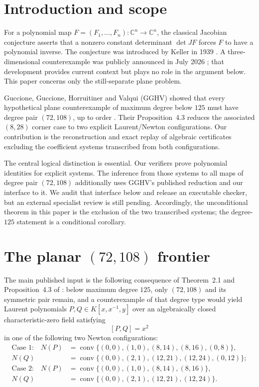\documentclass[11pt,a4paper]{article}
\theoremstyle{remark}
\newcommand{\C}{\mathbb{C}}
\begin{document}
\tableofcontents

\section{Introduction and scope}

For a polynomial map $F=(F_1,\ldots,F_n):\C^n\to\C^n$, the classical Jacobian conjecture asserts that a nonzero constant determinant $\det JF$ forces $F$ to have a polynomial inverse. The conjecture was introduced by Keller in 1939 \cite{Keller1939}. A three-dimensional counterexample was publicly announced in July 2026 \cite{Alpoge2026}; that development provides current context but plays no role in the argument below. This paper concerns only the still-separate plane problem.

Guccione, Guccione, Horruitiner and Valqui (GGHV) showed that every hypothetical plane counterexample of maximum degree below $125$ must have degree pair $(72,108)$, up to order \cite{GGHV2022}. Their Proposition~4.3 reduces the associated $(8,28)$ corner case to two explicit Laurent/Newton configurations. Our contribution is the reconstruction and exact replay of algebraic certificates excluding the coefficient systems transcribed from both configurations.

The central logical distinction is essential. Our verifiers prove polynomial identities for explicit systems. The inference from those systems to all maps of degree pair $(72,108)$ additionally uses GGHV's published reduction and our interface to it. We audit that interface below and release an executable checker, but an external specialist review is still pending. Accordingly, the unconditional theorem in this paper is the exclusion of the two transcribed systems; the degree-$125$ statement is a conditional corollary.

\section{The planar \texorpdfstring{$(72,108)$}{(72,108)} frontier}

The main published input is the following consequence of Theorem~2.1 and Proposition~4.3 of \cite{GGHV2022}: below maximum degree $125$, only $(72,108)$ and its symmetric pair remain, and a counterexample of that degree type would yield Laurent polynomials $P,Q\in K[x,x^{-1},y]$ over an algebraically closed characteristic-zero field satisfying
\[
[P,Q]=x^2
\]
in one of the following two Newton configurations:
\begin{align*}
\text{Case 1:}\quad
N(P)&=\operatorname{conv}\{(0,0),(1,0),(8,14),(8,16),(0,8)\},\\
N(Q)&=\operatorname{conv}\{(0,0),(2,1),(12,21),(12,24),(0,12)\};\\[0.4em]
\text{Case 2:}\quad
N(P)&=\operatorname{conv}\{(0,0),(1,0),(8,14),(8,16)\},\\
N(Q)&=\operatorname{conv}\{(0,0),(2,1),(12,21),(12,24)\}.
\end{align*}
\end{document}
